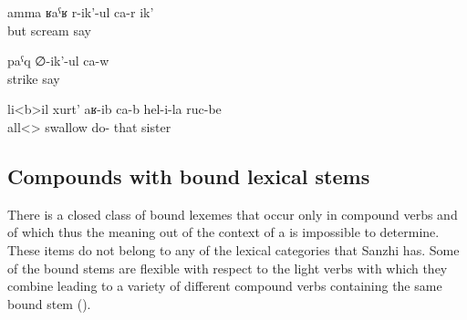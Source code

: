 \begin{exe}
	\ex	\label{ex:But she is screaming}
	\gll	amma	ʁaˁʁ	r-ik'-ul	ca-r	ik'\\
		but	scream	say		\\
	\glt	{}

	\ex	\label{ex:(He) is beating}
	\gll	paˁq	∅-ik'-ul	ca-w\\
		strike	say	\\
	\glt	{}

	\ex	\label{ex:(The wolf) swallowed all her sisters}
	\gll	li<b>il	xurt'	aʁ-ib	ca-b	hel-i-la	ruc-be\\
		all<>	swallow	do- 	that	sister\\
	\glt	{}
\end{exe}



\subsection{Compounds with bound lexical stems}
\label{ssec:compoundswithboundroots}

There is a closed class of bound lexemes that occur only in compound verbs and of which thus the meaning out of the context of a  is impossible to determine. These items do not belong to any of the lexical categories that Sanzhi has. Some of the bound stems are flexible with respect to the light verbs with which they combine leading to a variety of different compound verbs containing the same bound stem ().

